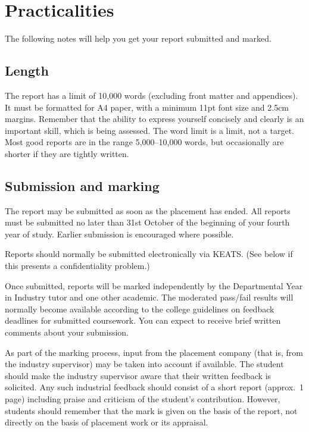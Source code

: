 \documentclass[british,12pt,a4paper]{report}
\begin{document}
\chapter{Practicalities}

The following notes will help you get your report submitted and marked.

\section{Length}

The report has a limit of 10,000 words (excluding front matter and appendices).
It must be formatted for A4 paper, with a minimum 11pt font size and 2.5cm margins.
Remember that the ability to express yourself concisely and clearly is an important
skill, which is being assessed.
The word limit is a limit, not a target.
Most good reports are in the range 5,000--10,000 words,
but occasionally are shorter if they are tightly written.

\section{Submission and marking}

The report may be submitted as soon as the placement has ended.
All reports must be submitted no later than 31st October of the beginning of your fourth year
of study.
Earlier submission is encouraged where possible.

Reports should normally be submitted electronically via KEATS.
(See below if this presents a confidentiality problem.)

Once submitted, reports will be marked independently by the Departmental Year in Industry
tutor and one other academic.
The moderated pass/fail results will normally become available according to the college guidelines
on feedback deadlines for submitted coursework.
You can expect to receive brief written comments about your submission.

As part of the marking process, input from the placement company
(that is, from the industry supervisor)
may be taken into account if available.
The student should make the industry supervisor aware that their written feedback is solicited.
Any such industrial feedback should consist of a short report (approx.\ 1 page)
including praise and criticism of the student's contribution.
However, students should remember that the mark is given on the basis of the report,
not directly on the basis of placement work or its appraisal.
\end{document}
